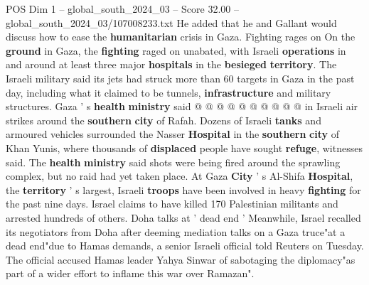 \begin{textsample}{POS Dim 1 – global\_south\_2024\_03 – Score 32.00 – global\_south\_2024\_03/107008233.txt}
He added that he and Gallant would discuss how to ease the \textbf{humanitarian} crisis in Gaza.
Fighting rages on On the \textbf{ground} in Gaza, the \textbf{fighting} raged on unabated, with Israeli \textbf{operations} in and around at least three major \textbf{hospitals} in the \textbf{besieged} \textbf{territory}.
The Israeli military said its jets had struck more than 60 targets in Gaza in the past day, including what it claimed to be tunnels, \textbf{infrastructure} and military structures.
Gaza ' s \textbf{health} \textbf{ministry} said @ @ @ @ @ @ @ @ @ @ in Israeli air strikes around the \textbf{southern} \textbf{city} of Rafah.
Dozens of Israeli \textbf{tanks} and armoured vehicles surrounded the Nasser \textbf{Hospital} in the \textbf{southern} \textbf{city} of Khan Yunis, where thousands of \textbf{displaced} people have sought \textbf{refuge}, witnesses said.
The \textbf{health} \textbf{ministry} said shots were being fired around the sprawling complex, but no raid had yet taken place.
At Gaza \textbf{City} ' s Al-Shifa \textbf{Hospital}, the \textbf{territory} ' s largest, Israeli \textbf{troops} have been involved in heavy \textbf{fighting} for the past nine days.
Israel claims to have killed 170 Palestinian militants and arrested hundreds of others.
Doha talks at ' dead end ' Meanwhile, Israel recalled its negotiators from Doha after deeming mediation talks on a Gaza truce"at a dead end"due to Hamas demands, a senior Israeli official told Reuters on Tuesday.
The official accused Hamas leader Yahya Sinwar of sabotaging the diplomacy"as part of a wider effort to inflame this war over Ramazan".

\end{textsample}
